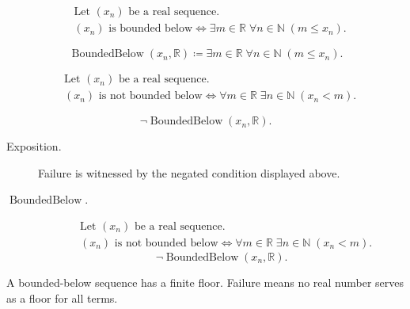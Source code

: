\begin{remark*}
\[
\begin{aligned}
&\text{Let } (x_n) \text{ be a real sequence.}\\
&(x_n) \text{ is bounded below}
\Longleftrightarrow
\exists m \in \mathbb{R}\;
\forall n \in \mathbb{N}\;(m \le x_n).
\end{aligned}
\]
\end{remark*}

\begin{remark*}
\[
\operatorname{BoundedBelow}(x_n,\mathbb{R})
\coloneqq
\exists m \in \mathbb{R}\;
\forall n \in \mathbb{N}\;(m \le x_n).
\]
\end{remark*}

\begin{remark*}
\[
\begin{aligned}
&\text{Let } (x_n) \text{ be a real sequence.}\\
&(x_n) \text{ is not bounded below}
\Longleftrightarrow
\forall m \in \mathbb{R}\;
\exists n \in \mathbb{N}\;(x_n < m).
\end{aligned}
\]
\end{remark*}

\begin{remark*}
\[
\neg\operatorname{BoundedBelow}(x_n,\mathbb{R}).
\]
\end{remark*}
\begin{remark*}
\begin{description}
  \item[Exposition.]
Failure is witnessed by the negated condition displayed above.
  \item[\(\operatorname{BoundedBelow}.\)]
\[
\begin{aligned}
&\text{Let } (x_n) \text{ be a real sequence.}\\
&(x_n) \text{ is not bounded below}
\Longleftrightarrow
\forall m \in \mathbb{R}\;
\exists n \in \mathbb{N}\;(x_n < m).
\end{aligned}
\]
\[
\neg\operatorname{BoundedBelow}(x_n,\mathbb{R}).
\]
\end{description}
\end{remark*}

\begin{remark*}[Interpretation]
A bounded-below sequence has a finite floor. Failure means no real number
serves as a floor for all terms.
\end{remark*}

